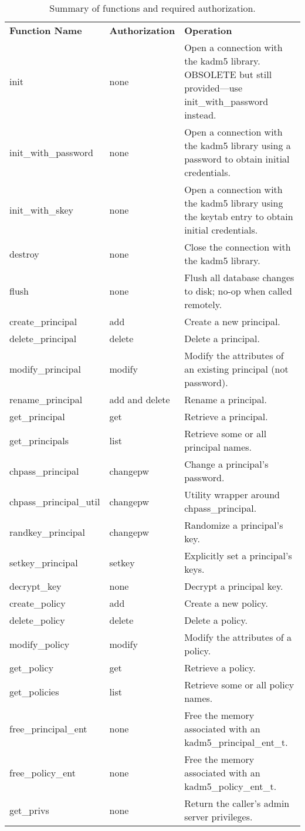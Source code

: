 \begin{table}[htbp]
\caption{Summary of functions and required authorization.}
\label{tab:func-overview}
\begin{tabular}{@{}llp{3.24in}}
\\
{\bf Function Name} & {\bf Authorization} & {\bf Operation} \\

init & none & Open a connection with the kadm5 library.  OBSOLETE
but still provided---use init_with_password instead. \\
init_with_password & none & Open a connection with the kadm5
library using a password to obtain initial credentials. \\
init_with_skey & none & Open a connection with the kadm5 library
using the keytab entry to obtain initial credentials. \\
destroy & none & Close the connection with the kadm5 library. \\
flush & none & Flush all database changes to disk; no-op when called
remotely. \\
create_principal & add & Create a new principal. \\
delete_principal & delete & Delete a principal. \\
modify_principal & modify & Modify the attributes of an existing
        principal (not password). \\
rename_principal & add and delete & Rename a principal. \\
get_principal & get\footnotemark & Retrieve a principal. \\
get_principals & list & Retrieve some or all principal names. \\
chpass_principal & changepw\footnotemark[\thefootnote] &
         Change a principal's password. \\
chpass_principal_util & changepw\footnotemark[\thefootnote] & Utility wrapper around chpass_principal. \\
randkey_principal & changepw\footnotemark[\thefootnote] &
        Randomize a principal's key. \\
setkey_principal & setkey & Explicitly set a principal's keys. \\
decrypt_key & none & Decrypt a principal key. \\
create_policy & add & Create a new policy. \\
delete_policy & delete & Delete a policy. \\
modify_policy & modify & Modify the attributes of a policy. \\
get_policy & get & Retrieve a policy. \\
get_policies & list & Retrieve some or all policy names. \\
free_principal_ent & none & Free the memory associated with an
                kadm5_principal_ent_t. \\
free_policy_ent & none & Free the memory associated with an
                kadm5_policy_ent_t. \\
get_privs & none & Return the caller's admin server privileges.
\end{tabular}
\end{table}
